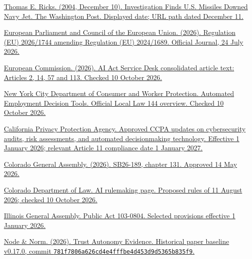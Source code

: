 \documentclass[11pt]{article}
\newenvironment{TAEReferences}{%
  \begin{list}{}{%
    \renewcommand{\makelabel}[1]{}%
    \setlength{\labelwidth}{0pt}%
    \setlength{\labelsep}{0pt}%
    \setlength{\leftmargin}{0.5in}%
    \setlength{\itemindent}{-0.5in}%
    \setlength{\itemsep}{0.45em}%
    \setlength{\parsep}{0pt}%
    \setlength{\topsep}{0.25em}%
  }%
}{\end{list}}
\begin{document}
\begin{TAEReferences}
\item{}\label{reference-58} \href{https://www.washingtonpost.com/archive/politics/2004/12/11/investigation-finds-us-missiles-downed-navy-jet/323e76f1-31d5-49c1-a27a-df9f389b0532/}{Thomas E. Ricks. (2004, December 10). Investigation Finds U.S. Missiles Downed Navy Jet. The Washington Post. Displayed date; URL path dated December 11.}
\item{}\label{reference-59} \href{https://eur-lex.europa.eu/legal-content/EN/ALL/?uri=oj\%3AL_202601744}{European Parliament and Council of the European Union. (2026). Regulation (EU) 2026/1744 amending Regulation (EU) 2024/1689. Official Journal, 24 July 2026.}
\item{}\label{reference-60} \href{https://ai-act-service-desk.ec.europa.eu/en/ai-act/article-14}{European Commission. (2026). AI Act Service Desk consolidated article text: Articles 2, 14, 57 and 113. Checked 10 October 2026.}
\item{}\label{reference-61} \href{https://www.nyc.gov/site/dca/about/automated-employment-decision-tools.page}{New York City Department of Consumer and Worker Protection. Automated Employment Decision Tools. Official Local Law 144 overview. Checked 10 October 2026.}
\item{}\label{reference-62} \href{https://www.cppa.ca.gov/regulations/pdf/ccpa_updates_cyber_risk_admt_appr_text.pdf}{California Privacy Protection Agency. Approved CCPA updates on cybersecurity audits, risk assessments, and automated decisionmaking technology. Effective 1 January 2026; relevant Article 11 compliance date 1 January 2027.}
\item{}\label{reference-63} \href{https://leg.colorado.gov/laws/session-laws/SB26-189/131/download}{Colorado General Assembly. (2026). SB26-189, chapter 131. Approved 14 May 2026.}
\item{}\label{reference-64} \href{https://coag.gov/ai/}{Colorado Department of Law. AI rulemaking page. Proposed rules of 11 August 2026; checked 10 October 2026.}
\item{}\label{reference-65} \href{https://www.ilga.gov/legislation/PublicActs/View/103-0804}{Illinois General Assembly. Public Act 103-0804. Selected provisions effective 1 January 2026.}
\item{}\label{reference-66} \href{https://github.com/node-and-norm/trust-autonomy-evidence/tree/781f7806a626cd4e4fffbe4d453d9d5365b835f9}{Node \& Norm. (2026). Trust Autonomy Evidence. Historical paper baseline v0.17.0, commit \texttt{781f7806\allowbreak{}a626cd4e\allowbreak{}4fffbe4d\allowbreak{}453d9d53\allowbreak{}65b835f9}.}

\end{TAEReferences}
\end{document}
